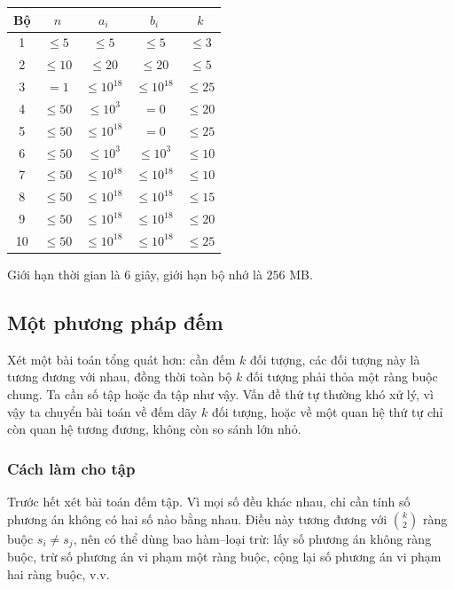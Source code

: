 \documentclass[11pt]{article}
\begin{document}
\begin{center}
\begin{tabular}{c c c c c}
\textbf{Bộ} & \(n\) & \(a_i\) & \(b_i\) & \(k\) \\
\hline
1 & \(\le 5\) & \(\le 5\) & \(\le 5\) & \(\le 3\) \\
2 & \(\le 10\) & \(\le 20\) & \(\le 20\) & \(\le 5\) \\
3 & \(=1\) & \(\le 10^{18}\) & \(\le 10^{18}\) & \(\le 25\) \\
4 & \(\le 50\) & \(\le 10^3\) & \(=0\) & \(\le 20\) \\
5 & \(\le 50\) & \(\le 10^{18}\) & \(=0\) & \(\le 25\) \\
6 & \(\le 50\) & \(\le 10^3\) & \(\le 10^3\) & \(\le 10\) \\
7 & \(\le 50\) & \(\le 10^{18}\) & \(\le 10^{18}\) & \(\le 10\) \\
8 & \(\le 50\) & \(\le 10^{18}\) & \(\le 10^{18}\) & \(\le 15\) \\
9 & \(\le 50\) & \(\le 10^{18}\) & \(\le 10^{18}\) & \(\le 20\) \\
10 & \(\le 50\) & \(\le 10^{18}\) & \(\le 10^{18}\) & \(\le 25\)
\end{tabular}
\end{center}

Giới hạn thời gian là \(6\) giây, giới hạn bộ nhớ là \(256\) MB.

\subsection{Một phương pháp đếm}

Xét một bài toán tổng quát hơn: cần đếm \(k\) đối tượng, các đối tượng này là
tương đương với nhau, đồng thời toàn bộ \(k\) đối tượng phải thỏa một ràng buộc
chung. Ta cần số tập hoặc đa tập như vậy. Vấn đề thứ tự thường khó xử lý, vì
vậy ta chuyển bài toán về đếm dãy \(k\) đối tượng, hoặc về một quan hệ thứ tự
chỉ còn quan hệ tương đương, không còn so sánh lớn nhỏ.

\subsubsection{Cách làm cho tập}

Trước hết xét bài toán đếm tập. Vì mọi số đều khác nhau, chỉ cần tính số phương
án không có hai số nào bằng nhau. Điều này tương đương với
\(\binom{k}{2}\) ràng buộc \(s_i\ne s_j\), nên có thể dùng bao hàm--loại trừ:
lấy số phương án không ràng buộc, trừ số phương án vi phạm một ràng buộc, cộng
lại số phương án vi phạm hai ràng buộc, v.v.
\end{document}
